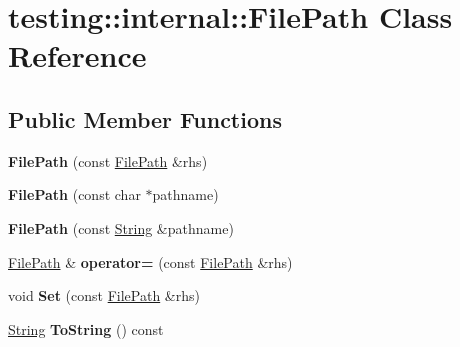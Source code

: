 \hypertarget{classtesting_1_1internal_1_1_file_path}{}\section{testing\+:\+:internal\+:\+:File\+Path Class Reference}
\label{classtesting_1_1internal_1_1_file_path}
\subsection*{Public Member Functions}
\begin{DoxyCompactItemize}
\item 
\mbox{\label{classtesting_1_1internal_1_1_file_path_ae9efd0fee56c6e3e2d659b464250b112}} 
{\bfseries File\+Path} (const \mbox{\hyperlink{classtesting_1_1internal_1_1_file_path}{File\+Path}} \&rhs)
\item 
\mbox{\label{classtesting_1_1internal_1_1_file_path_a12b51ed9a9ee1819b4f53c0a54e58360}} 
{\bfseries File\+Path} (const char $\ast$pathname)
\item 
\mbox{\label{classtesting_1_1internal_1_1_file_path_af1f85bf5d700f6be340defb8c4b70e3d}} 
{\bfseries File\+Path} (const \mbox{\hyperlink{classtesting_1_1internal_1_1_string}{String}} \&pathname)
\item 
\mbox{\label{classtesting_1_1internal_1_1_file_path_a8d9c1bafb90f10bcd5611a54d8f326ef}} 
\mbox{\hyperlink{classtesting_1_1internal_1_1_file_path}{File\+Path}} \& {\bfseries operator=} (const \mbox{\hyperlink{classtesting_1_1internal_1_1_file_path}{File\+Path}} \&rhs)
\item 
\mbox{\label{classtesting_1_1internal_1_1_file_path_a15a42de7518e89254e0640dd9317d5f7}} 
void {\bfseries Set} (const \mbox{\hyperlink{classtesting_1_1internal_1_1_file_path}{File\+Path}} \&rhs)
\item 
\mbox{\label{classtesting_1_1internal_1_1_file_path_ab9e08d92bc1a11cbfef6dda8792bb0df}} 
\mbox{\hyperlink{classtesting_1_1internal_1_1_string}{String}} {\bfseries To\+String} () const

\end{DoxyCompactItemize}
